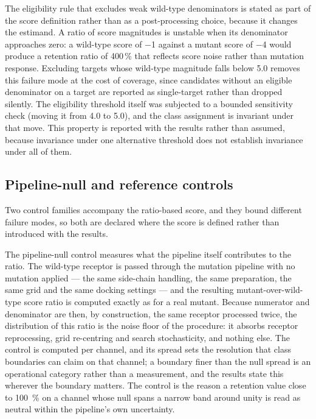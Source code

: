 The eligibility rule that excludes weak wild-type denominators is stated as part of the score definition rather than as a post-processing choice, because it changes the estimand. A ratio of score magnitudes is unstable when its denominator approaches zero: a wild-type score of \qty{-1}{\kcalmol} against a mutant score of \qty{-4}{\kcalmol} would produce a retention ratio of \num{400}\,\% that reflects score noise rather than mutation response. Excluding targets whose wild-type magnitude falls below \qty{5.0}{\kcalmol} removes this failure mode at the cost of coverage, since candidates without an eligible denominator on a target are reported as single-target rather than dropped silently. The eligibility threshold itself was subjected to a bounded sensitivity check (moving it from \qty{4.0}{\kcalmol} to \qty{5.0}{\kcalmol}), and the class assignment is invariant under that move. This property is reported with the results rather than assumed, because invariance under one alternative threshold does not establish invariance under all of them.

\subsection{Pipeline-null and reference controls}

Two control families accompany the ratio-based score, and they bound different failure modes, so both are declared where the score is defined rather than introduced with the results.

The pipeline-null control measures what the pipeline itself contributes to the ratio. The wild-type receptor is passed through the mutation pipeline with no mutation applied --- the same side-chain handling, the same preparation, the same grid and the same docking settings --- and the resulting mutant-over-wild-type score ratio is computed exactly as for a real mutant. Because numerator and denominator are then, by construction, the same receptor processed twice, the distribution of this ratio is the noise floor of the procedure: it absorbs receptor reprocessing, grid re-centring and search stochasticity, and nothing else. The control is computed per channel, and its spread sets the resolution that class boundaries can claim on that channel; a boundary finer than the null spread is an operational category rather than a measurement, and the results state this wherever the boundary matters. The control is the reason a retention value close to \qty{100}{\percent} on a channel whose null spans a narrow band around unity is read as neutral within the pipeline's own uncertainty.

